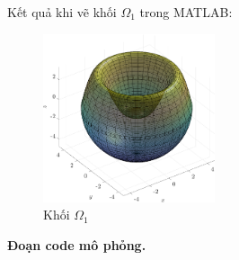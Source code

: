 \documentclass[12pt,a4paper]{article}
\begin{document}
Kết quả khi vẽ khối $\Omega_1$ trong MATLAB:
\begin{figure}[h!]
    \centering
    \includegraphics[width = 0.45\textwidth]{figure1.png}
    \caption{Khối $\Omega_1$}
\end{figure}
\newpage

\textbf{Đoạn code mô phỏng.}

\end{document}

